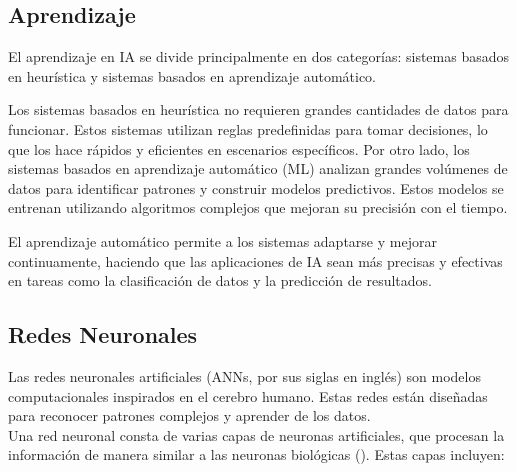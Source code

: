 \subsection{Aprendizaje}
El aprendizaje en IA se divide principalmente en dos categorías: sistemas basados en heurística y sistemas basados en aprendizaje automático.

Los sistemas basados en heurística no requieren grandes cantidades de datos para funcionar. Estos sistemas utilizan reglas predefinidas para tomar decisiones, lo que los hace rápidos y eficientes en escenarios específicos. Por otro lado, los sistemas basados en aprendizaje automático (ML) analizan grandes volúmenes de datos para identificar patrones y construir modelos predictivos. Estos modelos se entrenan utilizando algoritmos complejos que mejoran su precisión con el tiempo.

El aprendizaje automático permite a los sistemas adaptarse y mejorar continuamente, haciendo que las aplicaciones de IA sean más precisas y efectivas en tareas como la clasificación de datos y la predicción de resultados.

\subsection{Redes Neuronales}
Las redes neuronales artificiales (ANNs, por sus siglas en inglés) son modelos computacionales inspirados en el cerebro humano. Estas redes están diseñadas para reconocer patrones complejos y aprender de los datos.\\   
Una red neuronal consta de varias capas de neuronas artificiales, que procesan la información de manera similar a las neuronas biológicas (\cite{goodfellow2016deep}). Estas capas incluyen:

